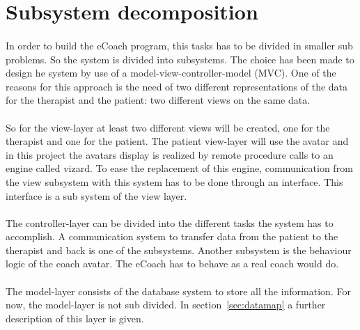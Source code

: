 \section{Subsystem decomposition}
\label{sec:subsystem}

\paragraph{}
In order to build the eCoach program, this tasks has to be divided in smaller sub problems. So the system is divided into subsystems. The choice has been made to design he system by use of a model-view-controller-model (MVC). One of the reasons for this approach is the need of two different representations of the data for the therapist and the patient: two different views on the same data.
\paragraph{}
So for the view-layer at least two different views will be created, one for the therapist and one for the patient. The patient view-layer will  use the avatar and in this project the avatars display is realized by remote procedure calls to an engine called vizard. To ease the replacement of this engine, communication from the view subsystem with this system has to be done through an interface. This interface is a sub system of the view layer.
\paragraph{}
The controller-layer can be divided into the different tasks the system has to accomplish. A communication system to transfer data from the patient to the therapist and back is one of the subsystems. Another subsystem is the behaviour logic of the coach avatar. The eCoach has to behave as a real coach would do. 
\paragraph{}
The model-layer consists of the database system to store all the information. For now, the model-layer is not sub divided. In section~\ref{sec:datamap} a further description of this layer is given.
